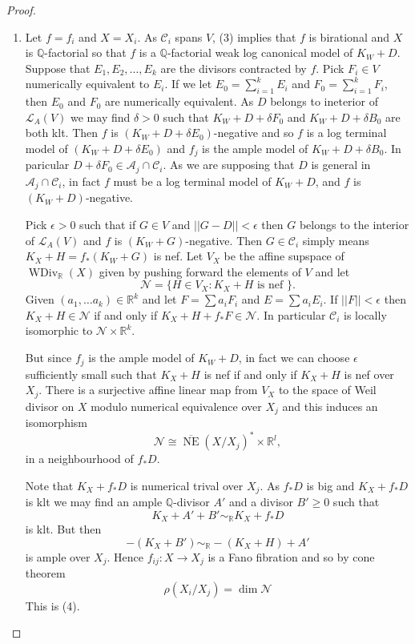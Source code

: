 \documentclass{article}
\begin{document}
\begin{proof}
\begin{enumerate}[1]
  \item Let $f=f_{i}$ and $X=X_{i}$. As $\mathcal{C}_{i}$ spans $V$, (3) implies that $f$ is birational and $X$ is $\mathbb{Q}$-factorial so that $f$ is a $\mathbb{Q}$-factorial weak log canonical model of $K_{W}+D$. Suppose that $E_{1},E_{2},\ldots ,E_{k}$ are the divisors contracted by $f$.  Pick $F_{i} \in V$ numerically equivalent to $E_{i}$. If we let $E_{0}= \sum^{k}_{i=1} E_{i}$ and $F_{0}= \sum^{k}_{i=1}F_{i} $, then $E_{0}$ and $F_{0}$ are numerically equivalent. As $D$ belongs to ineterior of $\mathcal{L}_{A}(V)$ we may find $\delta>0$ such that $K_{W}+D+\delta F_{0}$ and $K_{W}+D+\delta B_{0}$ are both klt. Then $f$ is $(K_{W}+D+  \delta E_{0})$-negative and so $f$ is a log terminal model of $(K_{W}+D+  \delta E_{0})$ and $f_{j} $ is the ample model of $K_{W}+D+\delta B_{0}$. In paricular  $D+\delta F_{0} \in \mathcal{A}_{j} \cap \mathcal{C}_{i}$. As we are supposing that $D$ is general in $\mathcal{A}_{j} \cap  \mathcal{C}_{i}$, in fact $f$ must be a log terminal model of $K_{W}+D$, and $f$ is $(K_{W}+D)$-negative.    

    Pick $\epsilon>0 $ such that if $G \in V$ and $||G-D||< \epsilon$ then $G$ belongs to the interior of $\mathcal{L}_{A}(V)$ and $f$ is $(K_{W}+G)$-negative. Then $G \in \mathcal{C}_{i}$ simply means  $K_{X}+H=f_*(K_{W}+G)$ is nef. Let $V_{X}$ be the affine supspace of $\operatorname{WDiv}_{\mathbb{R}}(X)$ given by pushing forward the elements of $V$ and let 
    \[
      \mathcal{N}= \{H \in V_{X}: K_X +H \text{ is nef }\} 
   . \]
  Given $(a_{1},\ldots a_{k})\in \mathbb{R}^k$ and let $F =\sum a_{i}F_{i}$ and $E=\sum a_{i}E_{i}$. If $||F||<\epsilon$ then $K_{X}+H \in \mathcal{N}$ if and only if $K_{X}+H+f_*F \in \mathcal{N}$. In particular $\mathcal{C}_{i}$ is locally isomorphic to $\mathcal{N} \times \mathbb{R}^k$.

  But since $f_{j}$ is the ample model of $K_{W}+D$, in fact we can choose $\epsilon$ sufficiently small such that $K_{X}+H$ is nef if and only if $K_{X}+H$ is nef over $X_j$. There is a surjective  affine linear map from $V_{X}$ to the space of Weil divisor on $X$ modulo numerical equivalence over $X_{j}$ and this induces an isomorphism
  \[
    \mathcal{N} \cong \overline{\operatorname{NE}}(X/X_{j})^* \times \mathbb{R}^l,
  \]
 in a neighbourhood of $f_*D$.

 Note that $K_{X}+f_* D$ is numerical trival over $X_{j}$. As $f_*D$ is big and $K_{X}+f_*D$ is klt we may find an ample $\mathbb{Q}$-divisor $A'$ and a divisor $B'\geqslant 0$ such that 
 \[
   K_{X}+A'+B' \sim_{\mathbb{R}} K_{X}+f_*D 
 \]
is klt. But then 
\[
  -(K_{X}+B')\sim_{\mathbb{R}}-(K_{X}+H)+A'
\]
is ample over $X_{j}$. Hence $f_{ij}:X\to X_{j}$ is a Fano fibration and so by cone theorem 
\[
  \rho(X_{i}/X_{j})=\dim \mathcal{N}
\]
This is (4).
  \end{enumerate}
\end{proof}
\end{document}
